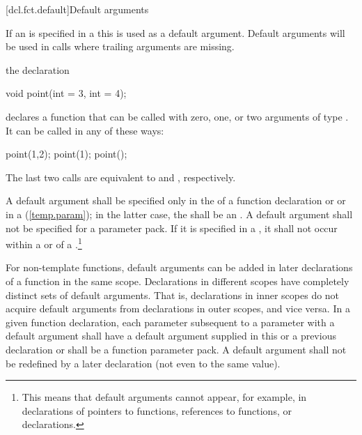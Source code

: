 [dcl.fct.default]{Default arguments}%

\pnum
If an  is specified in a
 this
is used as a default argument.
Default arguments will be used in calls where trailing arguments are missing.

\pnum
{}%
\enterexample
the declaration

\begin{codeblock}
void point(int = 3, int = 4);
\end{codeblock}

declares a function that can be called with zero, one, or two arguments of type
.
It can be called in any of these ways:

\begin{codeblock}
point(1,2);  point(1);  point();
\end{codeblock}

The last two calls are equivalent to
and
,
respectively.
\exitexample

\pnum
A default argument shall be specified only in the
of a function declaration
or 
or in a
(\ref{temp.param});
in the latter case, the  shall be an
.
A default argument shall not be specified for a parameter pack.
If it is specified in a
,
it shall not occur within a
or
of a
.\footnote{This means that default
arguments cannot appear,
for example, in declarations of pointers to functions,
references to functions, or
declarations.
}

\pnum
For non-template functions, default arguments can be added in later
declarations of a
function in the same scope.
Declarations in different
scopes have completely distinct sets of default arguments.
That
is, declarations in inner scopes do not acquire default
arguments from declarations in outer scopes, and vice versa.
In
a given function declaration, each parameter subsequent to a
parameter with a default argument shall have a default argument
supplied in this or a previous declaration
or shall be a function parameter pack.
A default argument
shall not be redefined by a later declaration (not even to the
same value).
\enterexample

